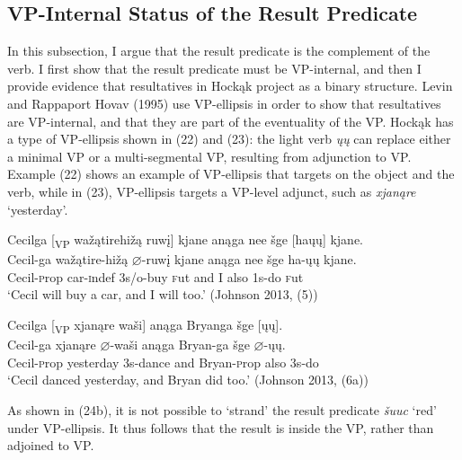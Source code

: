\documentclass[output=paper]{LSP/langsci}
\begin{document}
\subsection{VP-Internal Status of the Result Predicate}

In this subsection, I argue that the result predicate is the complement of the verb. I first show that the result predicate must be VP-internal, and then I provide evidence that resultatives in Hock\k{a}k project as a binary structure. Levin and Rappaport Hovav (1995) use VP-ellipsis in order to show that resultatives are VP-internal, and that they are part of the eventuality of the VP. Hock\k{a}k has a type of VP-ellipsis shown in (22) and (23): the light verb \textit{\k{u}\k{u}} can replace either a minimal VP or a multi-segmental VP, resulting from adjunction to VP. Example (22) shows an example of VP-ellipsis that targets on the object and the verb, while in (23), VP-ellipsis targets a VP-level adjunct, such as \textit{xjan\k{a}re} `yesterday'.

\begin{exe}

\ex \glll Cecilga [\textsubscript{VP} wa\v{z}\k{a}tirehi\v{z}\k{a} ruw\k{i}] kjane an\k{a}ga nee \v{s}ge [ha\k{u}\k{u}] kjane.\\
Cecil-ga {} wa\v{z}\k{a}tire-hi\v{z}\k{a} $\varnothing$-ruw\k{i} kjane an\k{a}ga nee \v{s}ge ha-\k{u}\k{u} kjane.\\
Cecil-{\textsc prop} {} car-{\textsc indef} {\textsc 3s/o}-buy {\textsc fut} and I also {\textsc 1s}-do {\textsc fut}\\
\glt `Cecil will buy a car, and I will too.' (Johnson 2013, (5))

\ex \glll Cecilga [\textsubscript{VP} xjan\k{a}re wa\v{s}i] an\k{a}ga Bryanga \v{s}ge [\k{u}\k{u}].\\
Cecil-ga {} xjan\k{a}re $\varnothing$-wa\v{s}i an\k{a}ga Bryan-ga \v{s}ge $\varnothing$-\k{u}\k{u}.\\
Cecil-{\textsc prop} {} yesterday {\textsc 3s}-dance and Bryan-{\textsc prop} also {\textsc 3s}-do\\
\glt `Cecil danced yesterday, and Bryan did too.' (Johnson 2013, (6a))

\end{exe}

As shown in (24b), it is not possible to `strand' the result predicate \textit{\v{s}uuc} `red' under VP-ellipsis. It thus follows that the result is inside the VP, rather than adjoined to VP.
\end{document}
